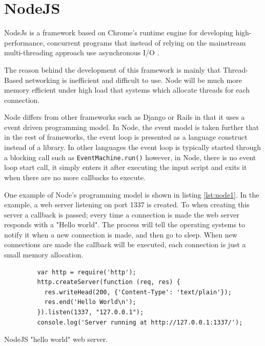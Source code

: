 \section{NodeJS}\label{sec:node}

NodeJs is a framework based on Chrome's runtime engine \cite{v8} for developing high-performance, concurrent programs that instead of relying on the mainstream multi-threading approach use asynchronous I/O \cite{tilkov2010node}.

The reason behind the development of this framework is mainly that Thread-Based networking is inefficient and difficult to use. Node will be much more memory efficient under high load that systems which allocate threads for each connection.

Node differs from other frameworks such as Django or Rails in that it uses a event driven programming model. In Node, the event model is taken further that in the rest of frameworks, the event loop is presented as a language construct instead of a library. In other languages the event loop is typically started through a blocking call such as \texttt{EventMachine.run()} however, in Node, there is no event loop start call, it simply enters it after executing the input script and exits it when there are no more callbacks to execute.

One example of Node's programming model is shown in listing \ref{lst:node1}. In the example, a web server listening on port 1337 is created. To when creating this server a callback is passed; every time a connection is made the web server responds with a "Hello world". The process will tell the operating systems to notify it when a new connection is made, and then go to sleep. When new connections are made the callback will be executed, each connection is just a small memory allocation.

\begin{listing}[ht]\centering
  \begin{minipage}{.6\textwidth}
    \begin{verbatim}
	     var http = require('http');
	     http.createServer(function (req, res) {
	       res.writeHead(200, {'Content-Type': 'text/plain'});
	       res.end('Hello World\n');
	     }).listen(1337, "127.0.0.1");
	     console.log('Server running at http://127.0.0.1:1337/');
    \end{verbatim}
  \end{minipage}
  \caption{NodeJS "hello world" web server.}\label{lst:node1}
\end{listing}

